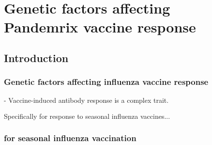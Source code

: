 %
%

\chapter{Genetic factors affecting Pandemrix vaccine response}
\label{chap:hird_reQTL}

\section{Introduction}

\subsection{Genetic factors affecting influenza vaccine response}

- Vaccine-induced antibody response is a complex trait.

Specifically for response to seasonal influenza vaccines...





\subsection{ for seasonal influenza vaccination}

